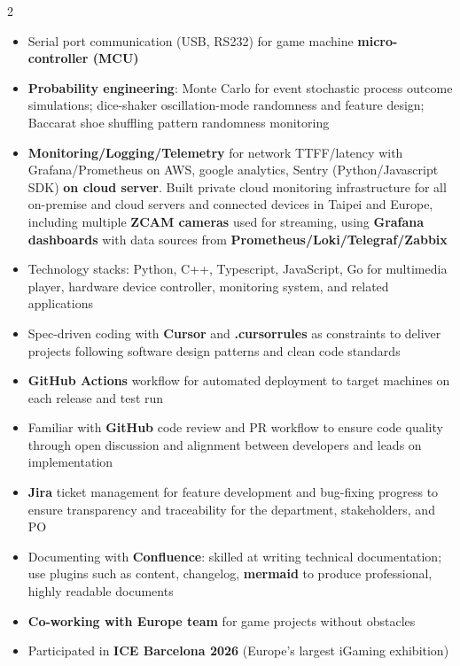 \documentclass[11pt]{article}
\begin{document}
\begin{multicols*}{2}
\begin{itemize}[noitemsep]
    \item Serial port communication (USB, RS232) for game machine \textbf{micro-controller (MCU)}
    \item \textbf{Probability engineering}: Monte Carlo for event stochastic process outcome simulations; dice-shaker oscillation-mode randomness and feature design; Baccarat shoe shuffling pattern randomness monitoring
    \item \textbf{Monitoring/Logging/Telemetry} for network TTFF/latency with Grafana/Prometheus on AWS,
    google analytics, Sentry (Python/Javascript SDK) \textbf{on cloud server}.
    Built private cloud monitoring infrastructure for all on-premise and cloud servers and connected devices in Taipei and Europe, including multiple \textbf{ZCAM cameras} used for streaming, using \textbf{Grafana dashboards} with data sources from \textbf{Prometheus/Loki/Telegraf/Zabbix}
    \item Technology stacks: Python, C++, Typescript, JavaScript, Go for multimedia player, hardware device controller, monitoring system, and related applications
    \item Spec-driven coding with \textbf{Cursor} and \textbf{.cursorrules} as constraints to deliver projects following software design patterns and clean code standards
    \item \textbf{GitHub Actions} workflow for automated deployment to target machines on each release and test run
    \item Familiar with \textbf{GitHub} code review and PR workflow to ensure code quality through open discussion and alignment between developers and leads on implementation
    \item \textbf{Jira} ticket management for feature development and bug-fixing progress to ensure transparency and traceability for the department, stakeholders, and PO
    \item Documenting with \textbf{Confluence}: skilled at writing technical documentation; use plugins such as content, changelog, \textbf{mermaid} to produce professional, highly readable documents
    \item \textbf{Co-working with Europe team} for game projects without obstacles
    \item Participated in \textbf{ICE Barcelona 2026} (Europe's largest iGaming exhibition)
\end{itemize}


\end{multicols*}
\end{document}
